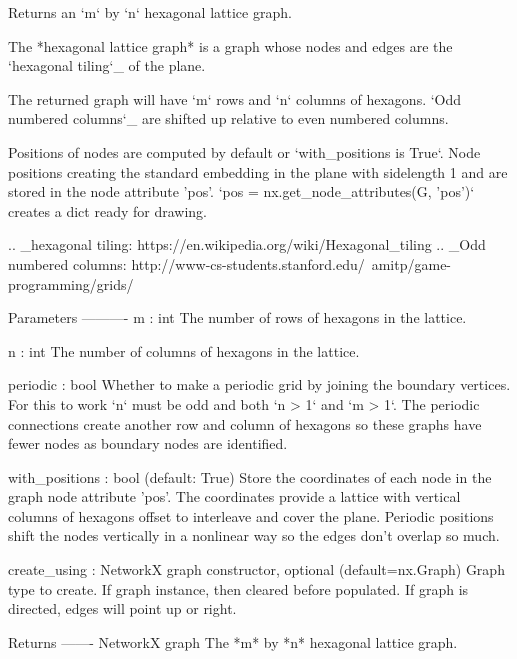 \begin{DoxyVerb}Returns an `m` by `n` hexagonal lattice graph.

The *hexagonal lattice graph* is a graph whose nodes and edges are
the `hexagonal tiling`_ of the plane.

The returned graph will have `m` rows and `n` columns of hexagons.
`Odd numbered columns`_ are shifted up relative to even numbered columns.

Positions of nodes are computed by default or `with_positions is True`.
Node positions creating the standard embedding in the plane
with sidelength 1 and are stored in the node attribute 'pos'.
`pos = nx.get_node_attributes(G, 'pos')` creates a dict ready for drawing.

.. _hexagonal tiling: https://en.wikipedia.org/wiki/Hexagonal_tiling
.. _Odd numbered columns: http://www-cs-students.stanford.edu/~amitp/game-programming/grids/

Parameters
----------
m : int
    The number of rows of hexagons in the lattice.

n : int
    The number of columns of hexagons in the lattice.

periodic : bool
    Whether to make a periodic grid by joining the boundary vertices.
    For this to work `n` must be odd and both `n > 1` and `m > 1`.
    The periodic connections create another row and column of hexagons
    so these graphs have fewer nodes as boundary nodes are identified.

with_positions : bool (default: True)
    Store the coordinates of each node in the graph node attribute 'pos'.
    The coordinates provide a lattice with vertical columns of hexagons
    offset to interleave and cover the plane.
    Periodic positions shift the nodes vertically in a nonlinear way so
    the edges don't overlap so much.

create_using : NetworkX graph constructor, optional (default=nx.Graph)
    Graph type to create. If graph instance, then cleared before populated.
    If graph is directed, edges will point up or right.

Returns
-------
NetworkX graph
    The *m* by *n* hexagonal lattice graph.
\end{DoxyVerb}
 \mbox{\label{namespacenetworkx_1_1generators_1_1lattice_a171ac7782fc671aa9e32e0eb9f3306f5}} 
